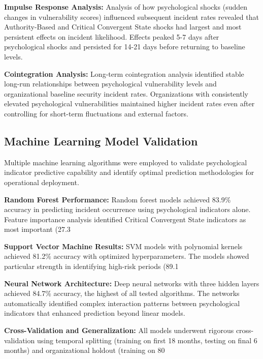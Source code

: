 \documentclass[10pt, twocolumn]{article}
\begin{document}
\textbf{Impulse Response Analysis:} Analysis of how psychological shocks (sudden changes in vulnerability scores) influenced subsequent incident rates revealed that Authority-Based and Critical Convergent State shocks had largest and most persistent effects on incident likelihood. Effects peaked 5-7 days after psychological shocks and persisted for 14-21 days before returning to baseline levels.

\textbf{Cointegration Analysis:} Long-term cointegration analysis identified stable long-run relationships between psychological vulnerability levels and organizational baseline security incident rates. Organizations with consistently elevated psychological vulnerabilities maintained higher incident rates even after controlling for short-term fluctuations and external factors.

\subsection{Machine Learning Model Validation}

Multiple machine learning algorithms were employed to validate psychological indicator predictive capability and identify optimal prediction methodologies for operational deployment.

\textbf{Random Forest Performance:} Random forest models achieved 83.9\% accuracy in predicting incident occurrence using psychological indicators alone. Feature importance analysis identified Critical Convergent State indicators as most important (27.3%

\textbf{Support Vector Machine Results:} SVM models with polynomial kernels achieved 81.2\% accuracy with optimized hyperparameters. The models showed particular strength in identifying high-risk periods (89.1%

\textbf{Neural Network Architecture:} Deep neural networks with three hidden layers achieved 84.7\% accuracy, the highest of all tested algorithms. The networks automatically identified complex interaction patterns between psychological indicators that enhanced prediction beyond linear models.

\textbf{Cross-Validation and Generalization:} All models underwent rigorous cross-validation using temporal splitting (training on first 18 months, testing on final 6 months) and organizational holdout (training on 80%
\end{document}
